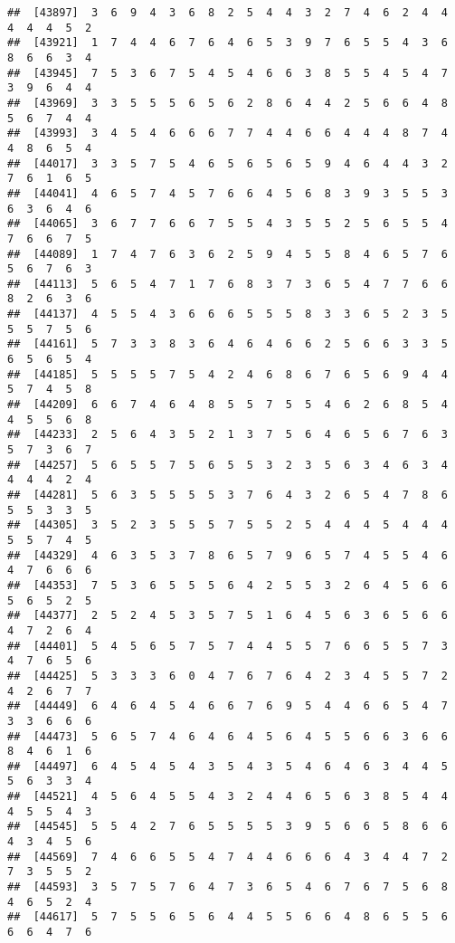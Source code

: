 \documentclass[
]{book}
\begin{document}
\begin{verbatim}
##  [43897]  3  6  9  4  3  6  8  2  5  4  4  3  2  7  4  6  2  4  4  4  4  4  5  2
##  [43921]  1  7  4  4  6  7  6  4  6  5  3  9  7  6  5  5  4  3  6  8  6  6  3  4
##  [43945]  7  5  3  6  7  5  4  5  4  6  6  3  8  5  5  4  5  4  7  3  9  6  4  4
##  [43969]  3  3  5  5  5  6  5  6  2  8  6  4  4  2  5  6  6  4  8  5  6  7  4  4
##  [43993]  3  4  5  4  6  6  6  7  7  4  4  6  6  4  4  4  8  7  4  4  8  6  5  4
##  [44017]  3  3  5  7  5  4  6  5  6  5  6  5  9  4  6  4  4  3  2  7  6  1  6  5
##  [44041]  4  6  5  7  4  5  7  6  6  4  5  6  8  3  9  3  5  5  3  6  3  6  4  6
##  [44065]  3  6  7  7  6  6  7  5  5  4  3  5  5  2  5  6  5  5  4  7  6  6  7  5
##  [44089]  1  7  4  7  6  3  6  2  5  9  4  5  5  8  4  6  5  7  6  5  6  7  6  3
##  [44113]  5  6  5  4  7  1  7  6  8  3  7  3  6  5  4  7  7  6  6  8  2  6  3  6
##  [44137]  4  5  5  4  3  6  6  6  5  5  5  8  3  3  6  5  2  3  5  5  5  7  5  6
##  [44161]  5  7  3  3  8  3  6  4  6  4  6  6  2  5  6  6  3  3  5  6  5  6  5  4
##  [44185]  5  5  5  5  7  5  4  2  4  6  8  6  7  6  5  6  9  4  4  5  7  4  5  8
##  [44209]  6  6  7  4  6  4  8  5  5  7  5  5  4  6  2  6  8  5  4  4  5  5  6  8
##  [44233]  2  5  6  4  3  5  2  1  3  7  5  6  4  6  5  6  7  6  3  5  7  3  6  7
##  [44257]  5  6  5  5  7  5  6  5  5  3  2  3  5  6  3  4  6  3  4  4  4  4  2  4
##  [44281]  5  6  3  5  5  5  5  3  7  6  4  3  2  6  5  4  7  8  6  5  5  3  3  5
##  [44305]  3  5  2  3  5  5  5  7  5  5  2  5  4  4  4  5  4  4  4  5  5  7  4  5
##  [44329]  4  6  3  5  3  7  8  6  5  7  9  6  5  7  4  5  5  4  6  4  7  6  6  6
##  [44353]  7  5  3  6  5  5  5  6  4  2  5  5  3  2  6  4  5  6  6  5  6  5  2  5
##  [44377]  2  5  2  4  5  3  5  7  5  1  6  4  5  6  3  6  5  6  6  4  7  2  6  4
##  [44401]  5  4  5  6  5  7  5  7  4  4  5  5  7  6  6  5  5  7  3  4  7  6  5  6
##  [44425]  5  3  3  3  6  0  4  7  6  7  6  4  2  3  4  5  5  7  2  4  2  6  7  7
##  [44449]  6  4  6  4  5  4  6  6  7  6  9  5  4  4  6  6  5  4  7  3  3  6  6  6
##  [44473]  5  6  5  7  4  6  4  6  4  5  6  4  5  5  6  6  3  6  6  8  4  6  1  6
##  [44497]  6  4  5  4  5  4  3  5  4  3  5  4  6  4  6  3  4  4  5  5  6  3  3  4
##  [44521]  4  5  6  4  5  5  4  3  2  4  4  6  5  6  3  8  5  4  4  4  5  5  4  3
##  [44545]  5  5  4  2  7  6  5  5  5  5  3  9  5  6  6  5  8  6  6  4  3  4  5  6
##  [44569]  7  4  6  6  5  5  4  7  4  4  6  6  6  4  3  4  4  7  2  7  3  5  5  2
##  [44593]  3  5  7  5  7  6  4  7  3  6  5  4  6  7  6  7  5  6  8  4  6  5  2  4
##  [44617]  5  7  5  5  6  5  6  4  4  5  5  6  6  4  8  6  5  5  6  6  6  4  7  6

\end{verbatim}
\end{document}
